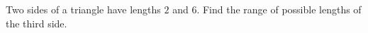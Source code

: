 Two sides of a triangle have lengths $2$ and $6$. Find the range of possible lengths of the third side.
